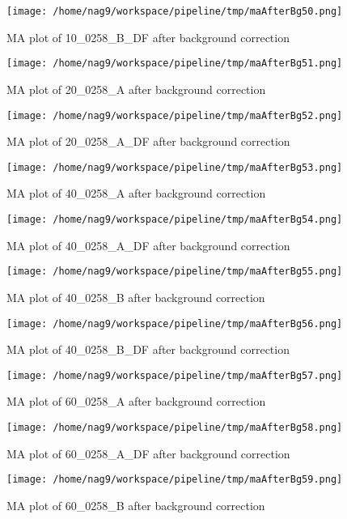 \documentclass[titlepage]{article}
\begin{document}
\begin{figure}[htb!]
\centering
\texttt{[image: /home/nag9/workspace/pipeline/tmp/maAfterBg50.png]}
\caption{MA plot of 10\_0258\_B\_DF after background correction}
\end{figure}\pagebreak
\begin{figure}[htb!]
\centering
\texttt{[image: /home/nag9/workspace/pipeline/tmp/maAfterBg51.png]}
\caption{MA plot of 20\_0258\_A after background correction}
\end{figure}\pagebreak
\begin{figure}[htb!]
\centering
\texttt{[image: /home/nag9/workspace/pipeline/tmp/maAfterBg52.png]}
\caption{MA plot of 20\_0258\_A\_DF after background correction}
\end{figure}\pagebreak
\begin{figure}[htb!]
\centering
\texttt{[image: /home/nag9/workspace/pipeline/tmp/maAfterBg53.png]}
\caption{MA plot of 40\_0258\_A after background correction}
\end{figure}\pagebreak
\begin{figure}[htb!]
\centering
\texttt{[image: /home/nag9/workspace/pipeline/tmp/maAfterBg54.png]}
\caption{MA plot of 40\_0258\_A\_DF after background correction}
\end{figure}\pagebreak
\begin{figure}[htb!]
\centering
\texttt{[image: /home/nag9/workspace/pipeline/tmp/maAfterBg55.png]}
\caption{MA plot of 40\_0258\_B after background correction}
\end{figure}\pagebreak
\begin{figure}[htb!]
\centering
\texttt{[image: /home/nag9/workspace/pipeline/tmp/maAfterBg56.png]}
\caption{MA plot of 40\_0258\_B\_DF after background correction}
\end{figure}\pagebreak
\begin{figure}[htb!]
\centering
\texttt{[image: /home/nag9/workspace/pipeline/tmp/maAfterBg57.png]}
\caption{MA plot of 60\_0258\_A after background correction}
\end{figure}\pagebreak
\begin{figure}[htb!]
\centering
\texttt{[image: /home/nag9/workspace/pipeline/tmp/maAfterBg58.png]}
\caption{MA plot of 60\_0258\_A\_DF after background correction}
\end{figure}\pagebreak
\begin{figure}[htb!]
\centering
\texttt{[image: /home/nag9/workspace/pipeline/tmp/maAfterBg59.png]}
\caption{MA plot of 60\_0258\_B after background correction}
\end{figure}\pagebreak
\end{document}
